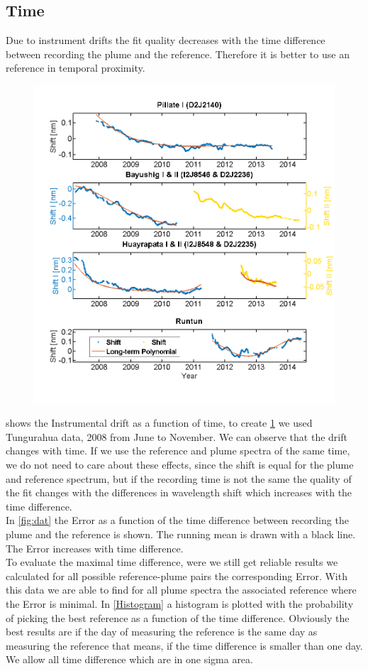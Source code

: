 \documentclass  [
  paper    = a4,
  BCOR     = 10mm,
  twoside,
  fontsize = 12pt,
  fleqn,
  toc      = bibnumbered,
  toc      = listofnumbered,
  numbers  = noendperiod,
  headings = normal,
  listof   = leveldown,
  version  = 3.03
]                                       {scrreprt}
\begin{document}
	
	\subsection{Time}
	Due to instrument drifts the fit quality decreases with the time difference between recording the plume and the reference. Therefore it is better to use an reference in temporal proximity.\\
	\begin{figure}[h]
		\centering
		\includegraphics[width=0.7\linewidth]{Bilder/Simon/Bilder_Tung/Drift_Komplett_NEW}
		\caption{}
		\label{fig:driftkomplettnew}
	\end{figure}
	 shows the Instrumental drift as a function of time, to create \cref{fig:driftkomplettnew} we used Tungurahua data, 2008 from June to November. We can observe that the drift changes with time. If we use the reference and plume spectra of the same time, we do not need to care about these effects, since the shift is equal for the plume and reference spectrum, but if the recording time is not the same the quality of the fit changes with the differences in wavelength shift which increases with the time difference.\\
	In \cref{fig:dat} the  Error as a function of the time difference between recording the plume and the reference is shown. The running mean is drawn with a black line. The  Error increases with time difference.\\
	To evaluate the maximal time difference, were we still get reliable results we calculated for all possible reference-plume pairs the corresponding  Error. With this data we are able to find for all plume spectra the associated reference where the  Error is minimal. In \cref{Histogram} a histogram is plotted with the probability of picking the best reference as a function of the time difference. Obviously the best results are if the day of measuring the reference is the same day as measuring the reference that means, if the time difference is smaller than one day. We allow all time difference which are in one sigma area. 
	
\end{document}
